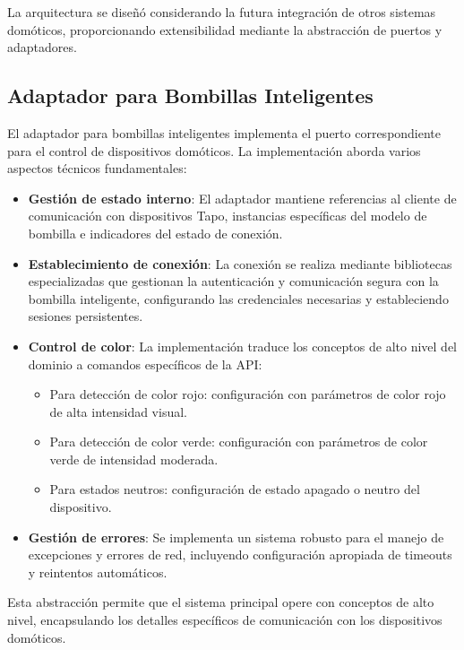 La arquitectura se diseñó considerando la futura integración de otros sistemas domóticos, proporcionando extensibilidad mediante la abstracción de puertos y adaptadores.

\subsection{Adaptador para Bombillas Inteligentes}

El adaptador para bombillas inteligentes implementa el puerto correspondiente para el control de dispositivos domóticos. La implementación aborda varios aspectos técnicos fundamentales:

\begin{itemize}
    \item \textbf{Gestión de estado interno}: El adaptador mantiene referencias al cliente de comunicación con dispositivos Tapo, instancias específicas del modelo de bombilla e indicadores del estado de conexión.
    
    \item \textbf{Establecimiento de conexión}: La conexión se realiza mediante bibliotecas especializadas que gestionan la autenticación y comunicación segura con la bombilla inteligente, configurando las credenciales necesarias y estableciendo sesiones persistentes.
    
    \item \textbf{Control de color}: La implementación traduce los conceptos de alto nivel del dominio a comandos específicos de la API:
    \begin{itemize}
        \item Para detección de color rojo: configuración con parámetros de color rojo de alta intensidad visual.
        \item Para detección de color verde: configuración con parámetros de color verde de intensidad moderada.
        \item Para estados neutros: configuración de estado apagado o neutro del dispositivo.
    \end{itemize}
    
    \item \textbf{Gestión de errores}: Se implementa un sistema robusto para el manejo de excepciones y errores de red, incluyendo configuración apropiada de timeouts y reintentos automáticos.
\end{itemize}

Esta abstracción permite que el sistema principal opere con conceptos de alto nivel, encapsulando los detalles específicos de comunicación con los dispositivos domóticos.

